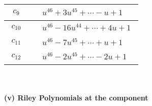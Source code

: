 \documentclass[1p]{elsarticle_modified}
\theoremstyle{definition}
\begin{document}
\begin{tabular}{m{50pt}|m{274pt}}
\hline $$\begin{aligned}c_{9}\end{aligned}$$&$\begin{aligned}
&u^{46}+3 u^{45}+\cdots- u+1
\end{aligned}$\\
\hline $$\begin{aligned}c_{10}\end{aligned}$$&$\begin{aligned}
&u^{46}-16 u^{44}+\cdots+4 u+1
\end{aligned}$\\
\hline $$\begin{aligned}c_{11}\end{aligned}$$&$\begin{aligned}
&u^{46}-7 u^{45}+\cdots+u+1
\end{aligned}$\\
\hline $$\begin{aligned}c_{12}\end{aligned}$$&$\begin{aligned}
&u^{46}-2 u^{45}+\cdots-2 u+1
\end{aligned}$\\
\hline
\end{tabular}\\~\\
\newpage\renewcommand{\arraystretch}{1}
\flushleft \textbf{(v) Riley Polynomials at the component}\newline \\
\end{document}
